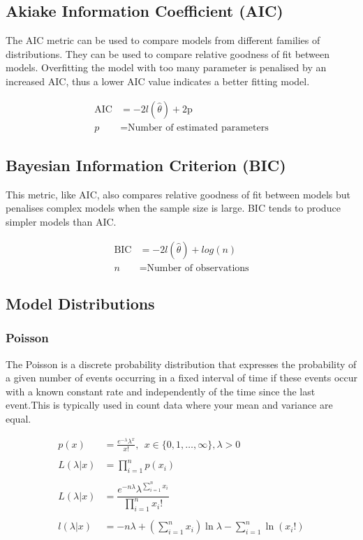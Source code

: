\documentclass[11pt,preprint, authoryear]{elsarticle}
\numberwithin{equation}{section}
\numberwithin{figure}{section}
\numberwithin{table}{section}
\begin{document}
\subsection{Akiake Information Coefficient
(AIC)}\label{akiake-information-coefficient-aic}

The AIC metric can be used to compare models from different families of
distributions. They can be used to compare relative goodness of fit
between models. Overfitting the model with too many parameter is
penalised by an increased AIC, thus a lower AIC value indicates a better
fitting model.

\begin{align*}
\text{AIC} &= -2l(\hat{\theta}) + 2\text{p} \\
p &= \text{Number of estimated parameters}
\end{align*}

\subsection{Bayesian Information Criterion
(BIC)}\label{bayesian-information-criterion-bic}

This metric, like AIC, also compares relative goodness of fit between
models but penalises complex models when the sample size is large. BIC
tends to produce simpler models than AIC.

\begin{align*}
\text{BIC} &= -2l(\hat{\theta}) + log(n) \\
n &= \text{Number of observations}
\end{align*}

\subsection{Model Distributions}\label{model-distributions}

\subsubsection{Poisson}\label{poisson}

The Poisson is a discrete probability distribution that expresses the
probability of a given number of events occurring in a fixed interval of
time if these events occur with a known constant rate and independently
of the time since the last event.This is typically used in count data
where your mean and variance are equal.

\begin{align*} 
p(x) & =  \frac{e^{-\lambda} \lambda^x}{x!},\ \ x\in \{0,1,\ldots,\infty\},\lambda>0 \\
\\
L(\lambda|x) & = \prod_{i=1}^n p(x_i) \\
\\
L(\lambda|x) & =\dfrac{e^{-n\lambda}\lambda^{\sum_{i=1}^n x_i}}{\prod_{i=1}^n x_i!}\\
\\
l(\lambda|x) & =-n\lambda +  \left(\sum_{i=1}^n x_i\right)\ln \lambda - \sum_{i=1}^{n}\ln(x_i!)
\end{align*}
\end{document}
